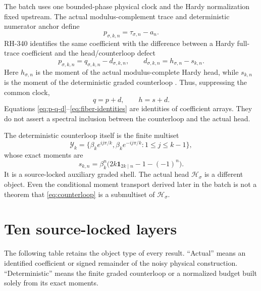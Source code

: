 \documentclass[11pt]{article}
\theoremstyle{definition}
\theoremstyle{remark}
\newcommand{\cH}{\mathcal H}
\newcommand{\cY}{\mathcal Y}
\newcommand{\one}{\mathbf 1}
\begin{document}
The batch uses one bounded-phase physical clock and the Hardy normalization
fixed upstream.  The actual modulus-complement trace and deterministic
numerator anchor define
\begin{equation}\label{eq:p-tau-a}
 p_{\sigma,k,n}=\tau_{\sigma,n}-a_n.
\end{equation}
RH-340 identifies the same coefficient with the difference between a Hardy
full-trace coefficient and the head/counterloop defect
\begin{equation}\label{eq:p-q-d}
 \boxed{p_{\sigma,k,n}=q_{\sigma,k,n}-d_{\sigma,k,n}},
 \qquad
 \boxed{d_{\sigma,k,n}=h_{\sigma,n}-s_{k,n}}.
\end{equation}
Here $h_{\sigma,n}$ is the moment of the actual modulus-complete Hardy head,
while $s_{k,n}$ is the moment of the deterministic graded counterloop
\citep{WangSynchronization2026,WangUpperBurden2026}.  Thus, suppressing the
common clock,
\begin{equation}\label{eq:fiber-identities}
 q=p+d,\qquad h=s+d.
\end{equation}
Equations \eqref{eq:p-q-d}--\eqref{eq:fiber-identities} are identities of
coefficient arrays.  They do not assert a spectral inclusion between the
counterloop and the actual head.

The deterministic counterloop itself is the finite multiset
\begin{equation}\label{eq:counterloop}
 \cY_k=\{\beta_ke^{ij\pi/k},\beta_ke^{-ij\pi/k}:1\le j\le k-1\},
\end{equation}
whose exact moments are
\begin{equation}\label{eq:s-ledger}
 s_{k,n}=\beta_k^n\bigl(2k\one_{2k\mid n}-1-(-1)^n\bigr).
\end{equation}
It is a source-locked auxiliary graded shell.  The actual head
$\cH_\sigma$ is a different object.  Even the conditional moment transport
derived later in the batch is not a theorem that \eqref{eq:counterloop} is a
submultiset of $\cH_\sigma$.

\section{Ten source-locked layers}

The following table retains the object type of every result.  ``Actual''
means an identified coefficient or signed remainder of the noisy physical
construction.  ``Deterministic'' means the finite graded counterloop or a
normalized budget built solely from its exact moments.
\end{document}
